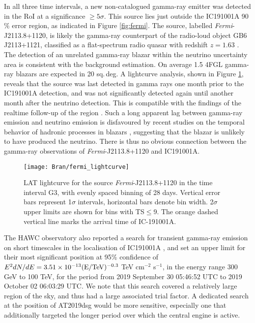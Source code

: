 In all three time intervals, a new non-catalogued gamma-ray emitter was detected in the RoI at a significance $\geq 5 \sigma$. This source lies just outside the IC191001A 90$\%$ error region, as indicated in Figure \ref{fig:fermi}. The source, labelled \textit{Fermi}-J2113.8+1120, is likely the gamma-ray counterpart of the radio-loud object GB6 J2113+1121, classified as a flat-spectrum radio quasar with redshift $z = 1.63$ . The detection of an unrelated gamma-ray blazar within the neutrino uncertainty area is consistent with the background estimation. On average 1.5 4FGL gamma-ray blazars are expected in 20 sq.\,deg. A lightcurve analysis, shown in Figure \ref{fig:fermi_lc}, reveals that the source was last detected in gamma rays one month prior to the IC191001A detection, and was not significantly detected again until another month after the neutrino detection. This is compatible with the findings of the realtime follow-up of the region \cite{garrappa_buson:gcn25932}. Such a long apparent lag between gamma-ray emission and neutrino emission is disfavoured by recent studies on the temporal behavior of hadronic processes in blazars , suggesting that the blazar is unlikely to have produced the neutrino. There is thus no obvious connection between the gamma-ray observations of \textit{Fermi}-J2113.8+1120 and IC191001A.

\begin{figure}
	\centering
	\texttt{[image: Bran/fermi\_lightcurve]}
	\caption{LAT lightcurve for the source \textit{Fermi}-J2113.8+1120 in the time interval G3, with evenly spaced binning of 28 days. Vertical error bars represent 1$\sigma$ intervals, horizontal bars denote bin width. 2$\sigma$ upper limits are shown for bins with TS$\leq$9. The orange dashed vertical line marks the arrival time of IC-191001A.}
	\label{fig:fermi_lc}
\end{figure}

The HAWC observatory also reported a search for transient gamma-ray emission on short timescales in the localisation of IC191001A , and set an upper limit for their most significant position at 95\% confidence of $E^{2} dN/dE = 3.51 \times 10^{-13} (\textup{E}/\textup{TeV})^{-0.3}$ TeV cm$^{-2}$ s$^{-1}$, in the energy range 300 GeV to 100 TeV, for the period from 2019 September 30 05:46:52 UTC to 2019 October 02 06:03:29 UTC. We note that this search covered a relatively large region of the sky, and thus had a large associated trial factor. A dedicated search at the position of AT2019dsg would be more sensitive, especially one that additionally targeted the longer period over which the central engine is active.

